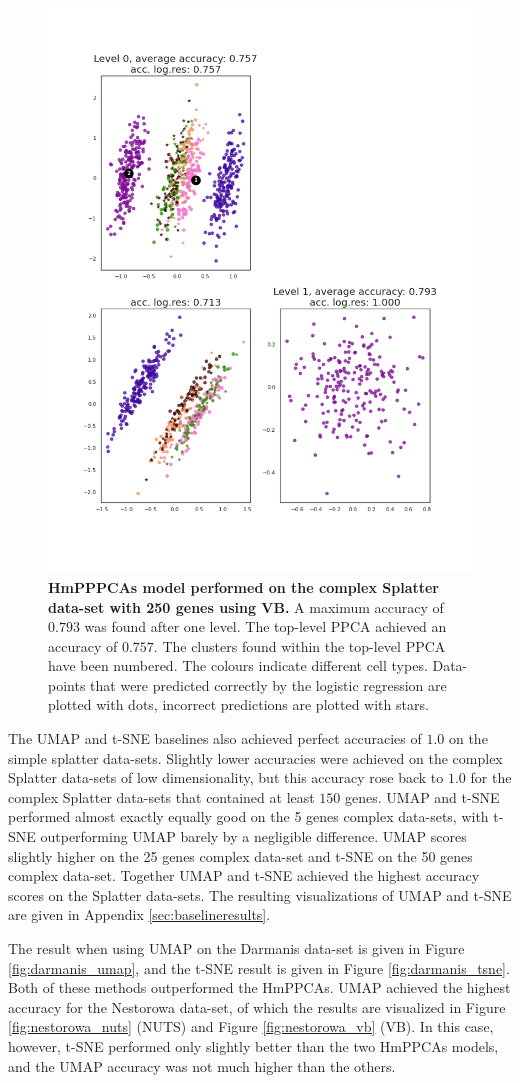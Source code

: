 \begin{figure}
    \centering
    \includegraphics[width=.6\linewidth]{figs/complex_250_vb.png}
    \caption[HmPPPCAs model performed on the complex Splatter data-set with 250 genes using VB]{\small \textbf{HmPPPCAs model performed on the complex Splatter data-set with 250 genes using VB.} A maximum accuracy of $0.793$ was found after one level. The top-level PPCA achieved an accuracy of $0.757$. The clusters found within the top-level PPCA have been numbered. The colours indicate different cell types. Data-points that were predicted correctly by the logistic regression are plotted with dots, incorrect predictions are plotted with stars.}
    \label{fig:complex_250_vb}
\end{figure}


The UMAP and t-SNE baselines also achieved perfect accuracies of $1.0$ on the simple splatter data-sets. Slightly lower accuracies were achieved on the complex Splatter data-sets of low dimensionality, but this accuracy rose back to $1.0$ for the complex Splatter data-sets that contained at least $150$ genes. UMAP and t-SNE performed almost exactly equally good on the 5 genes complex data-sets, with t-SNE outperforming UMAP barely by a negligible difference. UMAP scores slightly higher on the 25 genes complex data-set and t-SNE on the 50 genes complex data-set. Together UMAP and t-SNE achieved the highest accuracy scores on the Splatter data-sets. The resulting visualizations of UMAP and t-SNE are given in Appendix \ref{sec:baselineresults}.

The result when using UMAP on the Darmanis data-set is given in Figure \ref{fig:darmanis_umap}, and the t-SNE result is given in Figure \ref{fig:darmanis_tsne}. Both of these methods outperformed the HmPPCAs. UMAP achieved the highest accuracy for the Nestorowa data-set, of which the results are visualized in Figure \ref{fig:nestorowa_nuts} (NUTS) and Figure \ref{fig:nestorowa_vb} (VB). In this case, however, t-SNE performed only slightly better than the two HmPPCAs models, and the UMAP accuracy was not much higher than the others.



